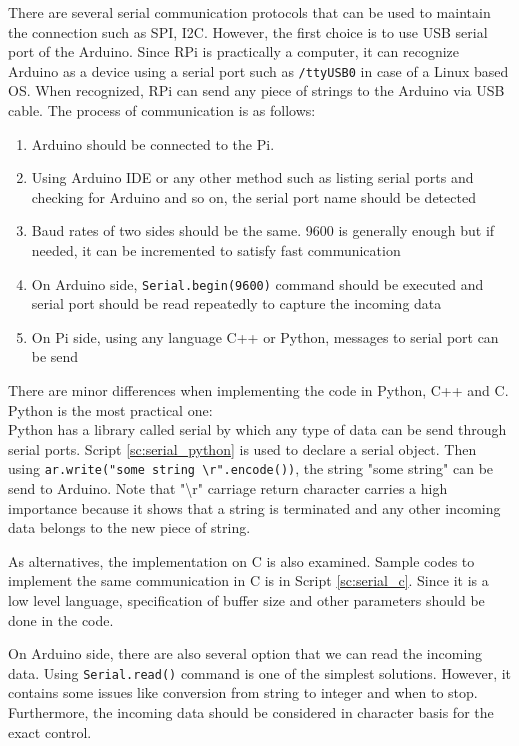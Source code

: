 \documentclass[a4paper,12pt]{article}
\begin{document}
	There are several serial communication protocols that can be used to maintain the connection such as SPI, I2C. However, the first choice is to use USB serial port of the Arduino. Since RPi is practically a computer, it can recognize Arduino as a device using a serial port such as \lstinline[language=Arduino]|/ttyUSB0| in case of a Linux based OS. When recognized, RPi can send any piece of strings to the Arduino via USB cable. The process of communication is as follows:
	\begin{enumerate}
		\item Arduino should be connected to the Pi.
		\item Using Arduino IDE or any other method such as listing serial ports and checking for Arduino and so on, the serial port name should be detected
		\item Baud rates of two sides should be the same. 9600 is generally enough but if needed, it can be incremented to satisfy fast communication
		\item On Arduino side, \texttt{Serial.begin(9600)} command should be executed and serial port should be read repeatedly to capture the incoming data
		\item On Pi side, using any language C++ or Python, messages to serial port can be send
	\end{enumerate}
	
	There are minor differences when implementing the code in Python, C++  and C. Python is the most practical one:\\
	
	Python has a library called serial by which any type of data can be send through serial ports. Script \ref{sc:serial_python} is used to declare a serial object. Then using \texttt{ar.write("some string \textbackslash r".encode())}, the string "some string" can be send to Arduino. Note that "\textbackslash r" carriage return character carries a high importance because it shows that a string is terminated and any other incoming data belongs to the new piece of string.  
	

	
	As alternatives, the implementation on C is also examined.	Sample codes to implement the same communication in C is in Script \ref{sc:serial_c}. Since it is a low level language, specification of buffer size and other parameters should be done in the code.

	On Arduino  side, there are also several option that we can read the incoming data. Using \texttt{Serial.read()}  command is one of the simplest solutions. However, it contains some issues like conversion from string to integer and when to stop. Furthermore, the incoming data should be considered in character basis for the exact control.  
	
\end{document}
